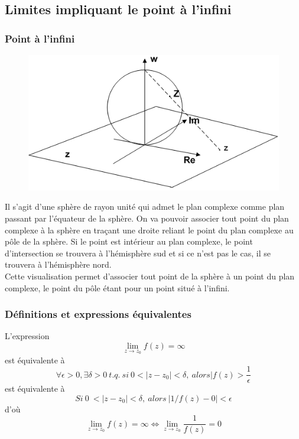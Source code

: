    \subsection{Limites impliquant le point à l'infini}
        \subsubsection{Point à l'infini}
        \begin{figure}
        \includegraphics[scale=0.2]{ch1/image1.png}
        \end{figure}
        Il s'agit d'une sphère de rayon unité qui admet le plan complexe comme plan passant par
        l'équateur de la sphère. On va pouvoir associer tout point du plan complexe à la sphère 
        en traçant une droite reliant le point du plan complexe au pôle de la sphère. Si le point
        est intérieur au plan complexe, le point d'intersection se trouvera à l'hémisphère sud et si ce n'est
        pas le cas, il se trouvera à l'hémisphère nord.\\
        
        Cette visualisation permet d'associer tout point de la sphère à un point du plan complexe, le
        point du pôle étant pour un point situé à l'infini.
        
        
        \subsubsection{Définitions et expressions équivalentes}
        L'expression 
        \begin{equation}
        \lim\limits_{z\rightarrow z_0} f(z) = \infty
        \end{equation}
        est équivalente à 
        \begin{equation}
        \forall \epsilon > 0, \exists \delta > 0\ t.q.\ si\ 0 < |z-z_0| < \delta,\ alors |f(z) > \frac{1}{\epsilon}
        \end{equation}
        est équivalente à
        \begin{equation}
        Si\ 0\ < |z-z_0| < \delta,\ alors\ |1/f(z) - 0| < \epsilon
        \end{equation}
        d'où
        \begin{equation}
        \lim\limits_{z\rightarrow z_0} f(z) = \infty \Leftrightarrow \lim\limits_{z\rightarrow z_0} \frac{1}{f(z)} = 0
        \end{equation}
        
